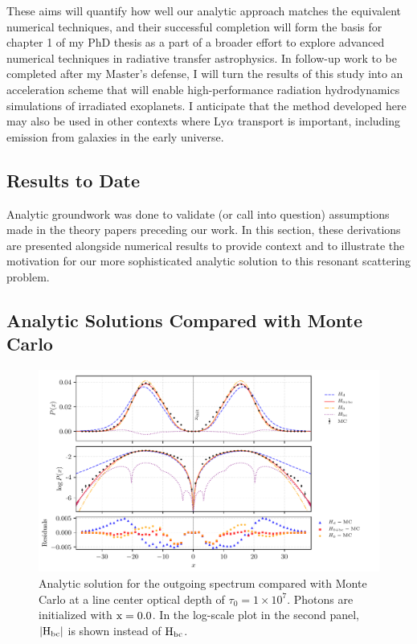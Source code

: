 \documentclass[onecolumn]{aastex63}
\begin{document}
 These aims will quantify how well our analytic approach matches the equivalent numerical techniques, and their successful completion will form the basis for chapter 1 of my PhD thesis as a part of a broader effort to explore advanced numerical techniques in radiative transfer astrophysics. In follow-up work to be completed after my Master's defense, I will turn the results of this study into an acceleration scheme that will enable high-performance radiation hydrodynamics simulations of irradiated exoplanets. I anticipate that the method developed here may also be used in other contexts where Ly$\alpha$ transport is important, including emission from galaxies in the early universe.

\subsection{Results to Date}

Analytic groundwork was done to validate (or call into question) assumptions made in the theory papers preceding our work. In this section, these derivations are presented alongside numerical results to provide context and to illustrate the motivation for our more sophisticated analytic solution to this resonant scattering problem.

\subsection{Analytic Solutions Compared with Monte Carlo}

\begin{figure}
    \centering
    \includegraphics{pdf_xinit0.0.pdf}
    \caption{Analytic solution for the outgoing spectrum compared with Monte Carlo at a line center optical depth of $\tau_0 = 1 \times 10^7$. Photons are initialized with $\rm x = 0.0$. In the log-scale plot in the second panel, $|\rm H_{bc}|$ is shown instead of $\rm H_{bc}$.} 
    \label{fig:sol_mc_residual_0}
\end{figure}
\end{document}
